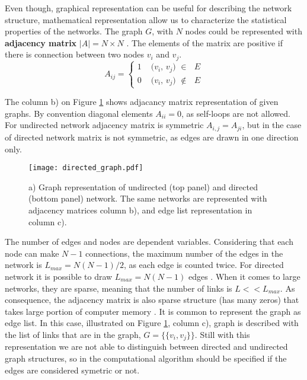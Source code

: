 Even though, graphical representation can be useful for describing the network structure, mathematical representation allow us to characterize the statistical properties of the networks. The graph $G$, with $N$ nodes could be represented with \textbf{adjacency matrix} $|A| = N \times N$ \cite{boccaletti2006complex}. The elements of the matrix are positive if there is connection between two nodes $v_i$ and $v_j$. 
\begin{equation}
A_{ij} =
\begin{cases}
1 & \text{ ($v_i$, $v_j$) $\in$ $E$}\\
0 & \text{ ($v_i$, $v_j$) $\notin$ $E$}
\end{cases}       
\end{equation}

The column b) on Figure \ref{fig:graph_dir} shows adjacancy matrix representation of given graphs. By convention diagonal elements $A_{ii}=0$, as self-loops are not allowed. For undirected network adjacency matrix is symmetric $A_{i,j}=A_{ji}$, but in the case of directed network matrix is not symmetric, as edges are drawn in one direction only.  

\begin{figure}[H]
	\centering
	\texttt{[image: directed\_graph.pdf]} 
	\caption{a) Graph representation of undirected (top panel) and directed (bottom panel) network. The same networks are represented with adjacency matrices column b), and edge list representation in column c).}
	\label{fig:graph_dir}
\end{figure}

The number of edges and nodes are dependent variables. Considering that each node can make $N-1$ connections, the maximum number of the edges in the network is $L_{max}=N(N-1)/2$, as each edge is counted twice. For directed network it is possible to draw $L_{max}=N(N-1)$ edges \cite{caldarelli2007scalefree}. When it comes to large networks, they are sparse, meaning that the number of links is $L<<L_{max}$. As consequence, the adjacency matrix is also sparse structure (has many zeros) that takes large portion of computer memory \cite{barabasi2016network}. 
It is common to represent the graph as edge list. In this case, illustrated on Figure \ref{fig:graph_dir}, column c), graph is described with the list of links that are in the graph, $G = \{ \{v_i,v_j\}\}$. Still with this representation we are not able to distinguish between directed and undirected graph structures, so in the computational algorithm should be specified if the edges are considered symetric or not.  


